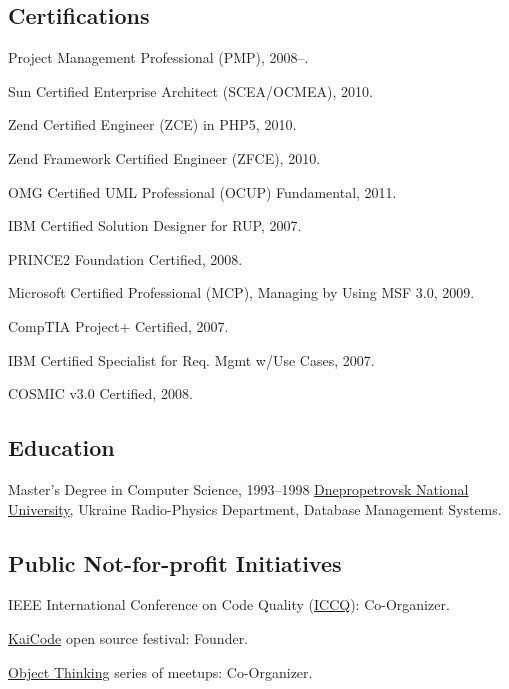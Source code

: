 \documentclass{yb}
\begin{document}
\subsection*{Certifications}

Project Management Professional (PMP), 2008--.

Sun Certified Enterprise Architect (SCEA/OCMEA), 2010.

Zend Certified Engineer (ZCE) in PHP5, 2010.

Zend Framework Certified Engineer (ZFCE), 2010.

OMG Certified UML Professional (OCUP) Fundamental, 2011.

IBM Certified Solution Designer for RUP, 2007.

PRINCE2 Foundation Certified, 2008.

Microsoft Certified Professional (MCP), Managing by Using MSF 3.0, 2009.

CompTIA Project+ Certified, 2007.

IBM Certified Specialist for Req. Mgmt w/Use Cases, 2007.

COSMIC v3.0 Certified, 2008.

\subsection*{Education}

\begin{samepage}
Master's Degree in Computer Science, 1993--1998\newline
\href{http://dnu.dp.ua/}{Dnepropetrovsk National University}, Ukraine\newline
Radio-Physics Department, Database Management Systems.
\end{samepage}

\subsection*{Public Not-for-profit Initiatives}

IEEE International Conference on Code Quality (\href{https://www.iccq.ru}{ICCQ}): Co-Organizer.

\href{https://www.kaicode.org}{KaiCode} open source festival: Founder.

\href{https://www.meetup.com/Object-Thinking/}{Object Thinking} series of meetups: Co-Organizer.

\end{document}
